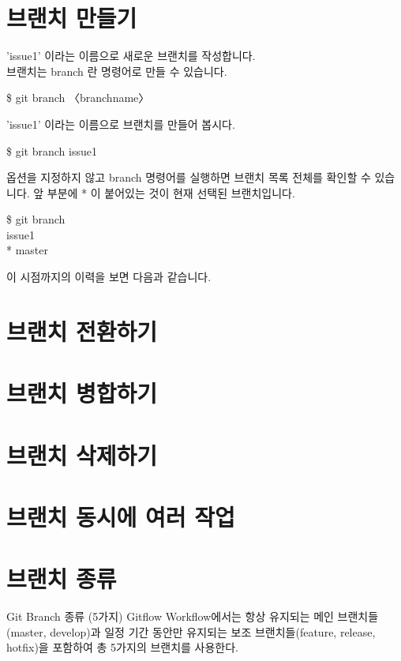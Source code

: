 \documentclass[12pt, a4paper, oneside]{book}
\let\stdsection\section
\renewcommand\section{\newpage\stdsection}
\begin{document}
	\section{브랜치 만들기 }

		'issue1' 이라는 이름으로 새로운 브랜치를 작성합니다.\\
		브랜치는 branch 란 명령어로 만들 수 있습니다.

		\begin{tcolorbox}
		\$ git branch 〈branchname〉
		\end{tcolorbox}


'issue1' 이라는 이름으로 브랜치를 만들어 봅시다.

		\begin{tcolorbox}
		\$ git branch issue1
		\end{tcolorbox}

옵션을 지정하지 않고 branch 명령어를 실행하면 브랜치 목록 전체를 확인할 수 있습니다. 앞 부분에 * 이 붙어있는 것이 현재 선택된 브랜치입니다.
		\begin{tcolorbox}
		\$ git branch  \\
		  issue1  \\
		* master  
		\end{tcolorbox}

이 시점까지의 이력을 보면 다음과 같습니다.






	\section{브랜치 전환하기 }
	\section{브랜치 병합하기 }
	\section{브랜치 삭제하기 }
	\section{브랜치 동시에 여러 작업 }
	\section{브랜치 종류 }


Git Branch 종류 (5가지)
Gitflow Workflow에서는 항상 유지되는 메인 브랜치들(master, develop)과 
일정 기간 동안만 유지되는 보조 브랜치들(feature, release, hotfix)을 포함하여 총 5가지의 브랜치를 사용한다.
\end{document}
